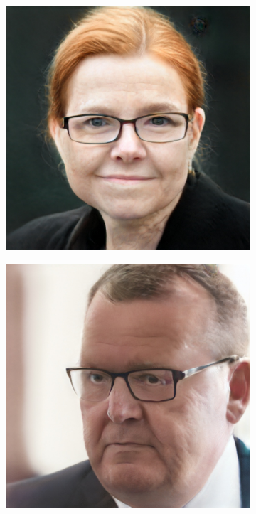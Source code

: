 \begin{figure}[h!]
    \begin{subfigure}[b]{0.24\textwidth}
        \includegraphics[width=\textwidth]{fig/stylegan/faceedit/inger-glasses}
    \end{subfigure}
    \begin{subfigure}[b]{0.24\textwidth}
        \includegraphics[width=\textwidth]{fig/stylegan/faceedit/lars-glasses}

\end{subfigure}
\end{figure}
